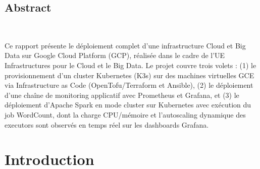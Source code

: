\documentclass{name}
\begin{document}







\fairemarges %
\fairepagedegarde %

\newpage
\setcounter{pagezero}{\value{0}}

\begin{center}
	\begin{minipage}{13cm}
	    \begin{center}
	        \section{Abstract}\\
	    \end{center}
			Ce rapport présente le déploiement complet d'une infrastructure Cloud et Big Data sur Google Cloud Platform (GCP), réalisée dans le cadre de l'UE Infrastructures pour le Cloud et le Big Data. Le projet couvre trois volets : (1) le provisionnement d'un cluster Kubernetes (K3s) sur des machines virtuelles GCE via Infrastructure as Code (OpenTofu/Terraform et Ansible), (2) le déploiement d'une chaîne de monitoring applicatif avec Prometheus et Grafana, et (3) le déploiement d'Apache Spark en mode cluster sur Kubernetes avec exécution du job WordCount, dont la charge CPU/mémoire et l'autoscaling dynamique des executors sont observés en temps réel sur les dashboards Grafana.
	\end{minipage}
\end{center}




\par
\setcounter{page}{\value{pagezero}}

\newpage
\setcounter{page}{\value{pagezero}}
\tableofcontents

\newpage
\section{Introduction}
\end{document}
